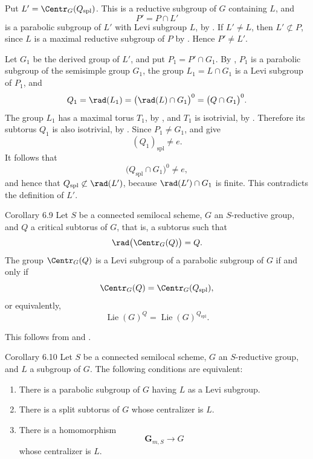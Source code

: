 Put \(L'=\Centr_G(Q_{\mathrm{spl}})\).  This is a reductive subgroup
of \(G\) containing \(L\), and
\[
 P'=P\cap L'
\]
is a parabolic subgroup of \(L'\) with Levi subgroup \(L\), by
.  If \(L'\ne L\), then \(L'\not\subset P\), since \(L\) is a
maximal reductive subgroup of \(P\) by .  Hence \(P'\ne L'\).

Let \(G_1\) be the derived group of \(L'\), and put
\(P_1=P'\cap G_1\).  By , \(P_1\) is a parabolic subgroup of the
semisimple group \(G_1\), the group \(L_1=L\cap G_1\) is a Levi
subgroup of \(P_1\), and
\[
 Q_1=\rad(L_1)
    =\bigl(\rad(L)\cap G_1\bigr)^0
    =\bigl(Q\cap G_1\bigr)^0.
\]
The group \(L_1\) has a maximal torus \(T_1\), by ,
and \(T_1\) is isotrivial, by .  Therefore its
subtorus \(Q_1\) is also isotrivial, by .  Since
\(P_1\ne G_1\),  and  give
\[
 (Q_1)_{\mathrm{spl}}\ne e.
\]
It follows that
\[
 \bigl(Q_{\mathrm{spl}}\cap G_1\bigr)^0\ne e,
\]
and hence that \(Q_{\mathrm{spl}}\not\subset\rad(L')\), because
\(\rad(L')\cap G_1\) is finite.  This contradicts the definition of
\(L'\).
\SGAQED


\begin{sgastatement}{Corollary 6.9}
Let \(S\) be a connected semilocal scheme, \(G\) an
\(S\)-reductive group, and \(Q\) a critical subtorus of \(G\), that
is, a subtorus such that
\[
 \rad\bigl(\Centr_G(Q)\bigr)=Q.
\]
The group \(\Centr_G(Q)\) is a Levi subgroup of a parabolic subgroup
of \(G\) if and only if
\[
 \Centr_G(Q)=\Centr_G(Q_{\mathrm{spl}}),
\]
or equivalently,
\[
 \operatorname{Lie}(G)^Q
   =\operatorname{Lie}(G)^{Q_{\mathrm{spl}}}.
\]
\end{sgastatement}

This follows from  and .

\begin{sgastatement}{Corollary 6.10}
Let \(S\) be a connected semilocal scheme, \(G\) an
\(S\)-reductive group, and \(L\) a subgroup of \(G\).  The following
conditions are equivalent:
\begin{enumerate}[label=\textup{(\roman*)}]
\item There is a parabolic subgroup of \(G\) having \(L\) as a Levi
subgroup.
\item There is a split subtorus of \(G\) whose centralizer is \(L\).
\item There is a homomorphism
\[
 \mathbf G_{m,S}\longrightarrow G
\]
whose centralizer is \(L\).
\end{enumerate}
\end{sgastatement}

